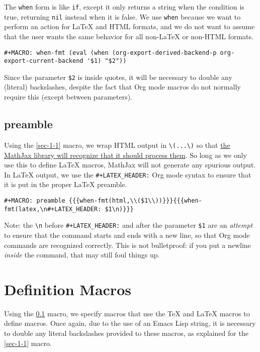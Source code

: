 \documentclass[11pt]{article}
\begin{document}
The \verb~when~ form is like \verb~if~, except it only returns a string when the
condition is true, returning \verb~nil~ instead when it is false.  We use
\verb~when~ because we want to perform an action for \LaTeX{} and HTML
formats, and we do not want to assume that the user wants the same
behavior for all non-\LaTeX{} or non-HTML formats.

\begin{verbatim}
#+MACRO: when-fmt (eval (when (org-export-derived-backend-p org-export-current-backend '$1) "$2"))
\end{verbatim}

Since the parameter \verb~$2~ is inside quotes, it will be necessary to
double any (literal) backslashes, despite the fact that Org mode
macros do not normally require this (except between parameters).

\subsection{preamble}
\label{sec-1-2}

Using the \ref{sec-1-1} macro, we wrap HTML output in \verb~\(...\)~ so that \href{http://docs.mathjax.org/en/latest/tex.html#defining-tex-macros}{the
MathJax library will recognize that it should process them}.  So long
as we only use this to define \LaTeX{} macros, MathJax will not generate
any spurious output.  In \LaTeX{} output, we use the \verb~#+LATEX_HEADER:~
Org mode syntax to ensure that it is put in the proper \LaTeX{} preamble.

\begin{verbatim}
#+MACRO: preamble {{{when-fmt(html,\\($1\\))}}}{{{when-fmt(latex,\n#+LATEX_HEADER: $1\n)}}}
\end{verbatim}

Note: the \verb~\n~ before \verb~#+LATEX_HEADER:~ and after the parameter \verb~$1~
are an \emph{attempt} to ensure that the command starts and ends with a new
line, so that Org mode commands are recognized correctly.  This is not
bulletproof: if you put a newline \emph{inside} the command, that may still
foul things up.

\section{Definition Macros}
\label{sec-2}

Using the \ref{sec-1-2} macro, we specify macros that use the \TeX{} and \LaTeX{}
macros to define macros.  Once again, due to the use of an Emacs Lisp
string, it is necessary to double any literal backslashes provided to
these macros, as explained for the \ref{sec-1-1} macro.
\end{document}

